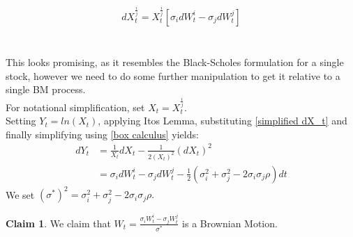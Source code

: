\documentclass{article}
\theoremstyle{definition}
\newtheorem{claim}{Claim}
\begin{document}
\begin{align}
\label{simplified dX_t}
    d X_t^{\frac{i}{j}} = X_t^{\frac{i}{j}}\left[\sigma_i dW_t^i - \sigma_j dW_t^j\right]
\end{align}
\\\\
This looks promising, as it resembles the Black-Scholes formulation for a single stock, however we need to do some further manipulation to get it relative to a single BM process.\\
For notational simplification, set $X_t = X_t^{\frac{i}{j}}$.\\
Setting $Y_t = ln\left(X_t\right)$, applying Itos Lemma, substituting \ref{simplified dX_t} and finally simplifying using \ref{box calculus} yields:
\begin{align}
    dY_t &= \frac{1}{X_t}dX_t - \frac{1}{2(X_t)^2} (dX_t)^2\\
    &= \sigma_i dW_t^i - \sigma_j dW_t^j - \frac{1}{2}\left(\sigma_i^2+\sigma_j^2-2\sigma_i\sigma_j\rho \right) dt
\end{align}
We set $(\sigma^*)^2 = \sigma_i^2+\sigma_j^2-2\sigma_i\sigma_j\rho.$
\begin{claim}
    We claim that $W_t = \frac{\sigma_i W_t^i-\sigma_j W_t^j}{\sigma^*}$ is a Brownian Motion.
\end{claim}
\end{document}
